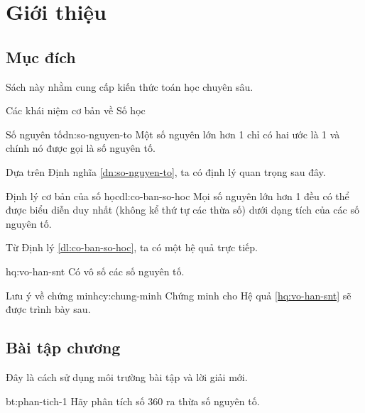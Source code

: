 \chapter{Giới thiệu}
\label{ch:intro}

\section{Mục đích}
Sách này nhằm cung cấp kiến thức toán học chuyên sâu.

\begin{lythuyetbox}{Các khái niệm cơ bản về Số học}

\begin{dinhnghia}{Số nguyên tố}{dn:so-nguyen-to}
Một số nguyên lớn hơn 1 chỉ có hai ước là 1 và chính nó được gọi là số nguyên tố.
\end{dinhnghia}

Dựa trên Định nghĩa \ref{dn:so-nguyen-to}, ta có định lý quan trọng sau đây.

\begin{dinhly}{Định lý cơ bản của số học}{dl:co-ban-so-hoc}
Mọi số nguyên lớn hơn 1 đều có thể được biểu diễn duy nhất (không kể thứ tự các thừa số) dưới dạng tích của các số nguyên tố.
\end{dinhly}

Từ Định lý \ref{dl:co-ban-so-hoc}, ta có một hệ quả trực tiếp.

\begin{hequa}{}{hq:vo-han-snt}
Có vô số các số nguyên tố.
\end{hequa}

\begin{chuy}{Lưu ý về chứng minh}{cy:chung-minh}
Chứng minh cho Hệ quả \ref{hq:vo-han-snt} sẽ được trình bày sau.
\end{chuy}

\end{lythuyetbox}

\section{Bài tập chương}

Đây là cách sử dụng môi trường bài tập và lời giải mới.

\begin{cauhoi}{bt:phan-tich-1}
Hãy phân tích số 360 ra thừa số nguyên tố.
\end{cauhoi}

